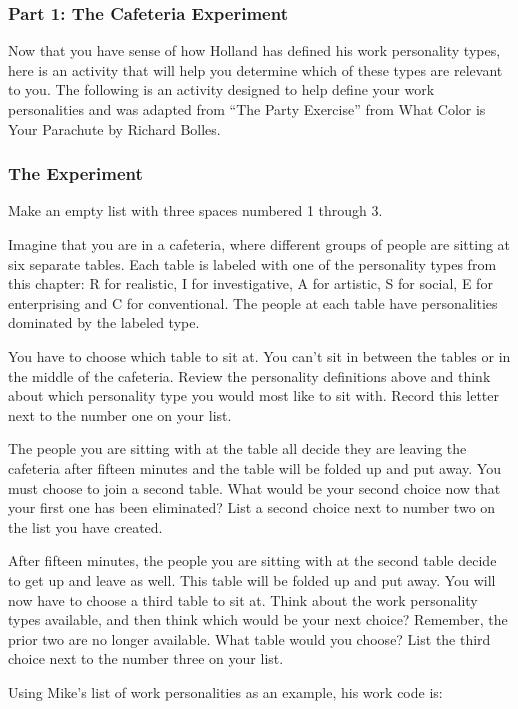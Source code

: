 \subsubsection*{Part 1: The Cafeteria Experiment}
Now that you have sense of how Holland has defined his work personality types, here is an activity that will help you determine which of these types are relevant to you. The following is an activity designed to help define your work personalities and was adapted from ``The Party Exercise'' from What Color is Your Parachute by Richard Bolles.

\subsubsection*{The Experiment}

Make an empty list with three spaces numbered 1 through 3.

Imagine that you are in a cafeteria, where different groups of people are sitting at six separate tables. Each table is labeled with one of the personality types from this chapter: R for realistic, I for investigative, A for artistic, S for social, E for enterprising and C for conventional. The people at each table have personalities dominated by the labeled type.

You have to choose which table to sit at. You can't sit in between the tables or in the middle of the cafeteria. Review the personality definitions above and think about which personality type you would most like to sit with. Record this letter next to the number one on your list.

The people you are sitting with at the table all decide they are leaving the cafeteria after fifteen minutes and the table will be folded up and put away. You must choose to join a second table. What would be your second choice now that your first one has been eliminated? List a second choice next to number two on the list you have created.

After fifteen minutes, the people you are sitting with at the second table decide to get up and leave as well. This table will be folded up and put away. You will now have to choose a third table to sit at. Think about the work personality types available, and then think which would be your next choice? Remember, the prior two are no longer available. What table would you choose? List the third choice next to the number three on your list.

Using Mike's list of work personalities as an example, his work code is:

